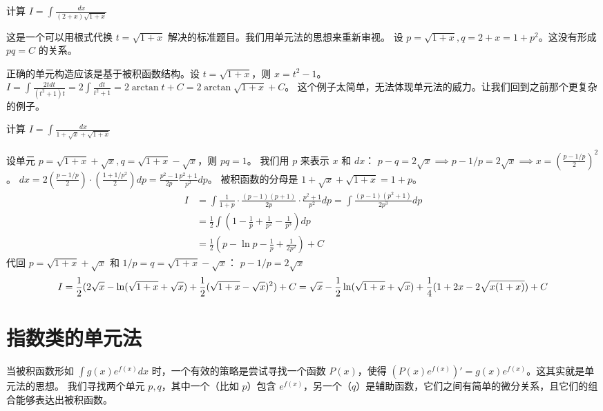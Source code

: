 \documentclass[lang=cn,newtx,10pt,scheme=chinese]{elegantbook}
\begin{document}
\begin{problem}
    计算 $I = \int \frac{dx}{(2+x)\sqrt{1+x}}$
\end{problem}
\begin{solution}
    这是一个可以用根式代换 $t=\sqrt{1+x}$ 解决的标准题目。我们用单元法的思想来重新审视。
    设 $p = \sqrt{1+x}, q = 2+x = 1+p^2$。这没有形成 $pq=C$ 的关系。
    
    正确的单元构造应该是基于被积函数结构。设 $t = \sqrt{1+x}$，则 $x=t^2-1$。
    $I = \int \frac{2t dt}{(t^2+1)t} = 2 \int \frac{dt}{t^2+1} = 2 \arctan t + C = 2\arctan\sqrt{1+x}+C$。
    这个例子太简单，无法体现单元法的威力。让我们回到之前那个更复杂的例子。
\end{solution}

\begin{problem}
    计算 $I = \int \frac{dx}{1+\sqrt{x}+\sqrt{1+x}}$
\end{problem}
\begin{solution}
    设单元 $p=\sqrt{1+x}+\sqrt{x}, q=\sqrt{1+x}-\sqrt{x}$，则 $pq=1$。
    我们用 $p$ 来表示 $x$ 和 $dx$：
    $p-q = 2\sqrt{x} \implies p - 1/p = 2\sqrt{x} \implies x = (\frac{p-1/p}{2})^2$。
    $dx = 2(\frac{p-1/p}{2}) \cdot (\frac{1+1/p^2}{2}) dp = \frac{p^2-1}{2p} \frac{p^2+1}{p^2} dp$。
    被积函数的分母是 $1+\sqrt{x}+\sqrt{1+x} = 1+p$。
    \begin{align*}
        I &= \int \frac{1}{1+p} \cdot \frac{(p-1)(p+1)}{2p} \cdot \frac{p^2+1}{p^2} dp = \int \frac{(p-1)(p^2+1)}{2p^3} dp \\
        &= \frac{1}{2} \int (1 - \frac{1}{p} + \frac{1}{p^2} - \frac{1}{p^3}) dp \\
        &= \frac{1}{2} (p - \ln p - \frac{1}{p} + \frac{1}{2p^2}) + C
    \end{align*}
    代回 $p = \sqrt{1+x}+\sqrt{x}$ 和 $1/p = q = \sqrt{1+x}-\sqrt{x}$：
    $p-1/p = 2\sqrt{x}$
    \begin{equation*}
        I = \frac{1}{2} (2\sqrt{x} - \ln(\sqrt{1+x}+\sqrt{x}) + \frac{1}{2}(\sqrt{1+x}-\sqrt{x})^2) + C \\
        = \sqrt{x} - \frac{1}{2}\ln(\sqrt{1+x}+\sqrt{x}) + \frac{1}{4}(1+2x-2\sqrt{x(1+x)}) + C
    \end{equation*}
\end{solution}

\section{指数类的单元法}
当被积函数形如 $\int g(x) e^{f(x)} dx$ 时，一个有效的策略是尝试寻找一个函数 $P(x)$，使得 $(P(x)e^{f(x)})' = g(x)e^{f(x)}$。这其实就是单元法的思想。
我们寻找两个单元 $p, q$，其中一个（比如 $p$）包含 $e^{f(x)}$，另一个（$q$）是辅助函数，它们之间有简单的微分关系，且它们的组合能够表达出被积函数。
\end{document}
